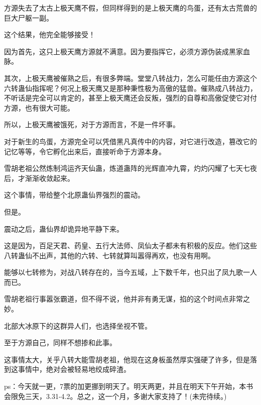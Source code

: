 \begin{this_body}
方源失去了太古上极天鹰不假，但同样得到的是上极天鹰的鸟蛋，还有太古荒兽的巨大尸躯一副。

这个结果，他完全能够接受！

因为首先，这只上极天鹰方源就不满意。因为要指挥它，必须方源伪装成黑家血脉。

其次，上极天鹰被催熟之后，有很多弊端。堂堂八转战力，怎么可能任由方源这个六转蛊仙指挥呢？何况上极天鹰又是那种秉性极为高傲的猛兽。催熟成八转战力，不听话是完全可以肯定的，甚至上极天鹰还会反叛，强烈的自尊和高傲促使它对付方源，也有很大可能。

所以，上极天鹰被饿死，对于方源而言，不是一件坏事。

对于新生的鸟蛋，方源完全可以凭借黑凡真传中的内容，对它进行改造，篡改它的记忆等等，令它孵化出来后，直接听命于方源本身。

雪胡老祖公然炼制鸿运齐天仙蛊，炼道蛊阵的光辉直冲九霄，灼灼闪耀了七天七夜后，才渐渐收敛起来。

这个事情，带给整个北原蛊仙界强烈的震动。

但是。

震动之后，蛊仙界却诡异地平静下来。

这是因为，百足天君、药皇、五行大法师、凤仙太子都未有积极的反应。他们这些八转蛊仙不出声，其他的六转、七转就算叫嚣得再欢，也没有用啊。

能够以七转修为，对战八转存在的，当今五域，上下数千年，也只出了凤九歌一人而已。

雪胡老祖行事嚣张霸道，但不得不说，他并非有勇无谋，掐的这个时间点非常之妙。

北部大冰原下的这群异人们，也选择坐视不管。

至于方源自己，同样不想掺和此事。

这事情太大，关乎八转大能雪胡老祖，他现在这身板虽然厚实强硬了许多，但是落到这事情中，绝对会被轻易地绞成碎渣。

ps：今天就一更，7票的加更挪到明天了。明天两更，并且在明天下午开始，本书会限免三天，3.31-4.2。总之，这一个月，多谢大家支持了！(未完待续。)

\end{this_body}

